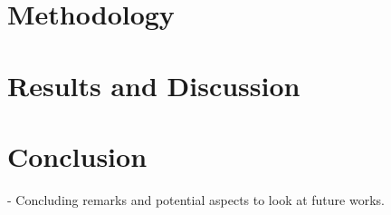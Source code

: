 \chapter{Methodology}


\chapter{Results and Discussion}


\chapter{Conclusion}

- Concluding remarks and potential aspects to look at future works.






















